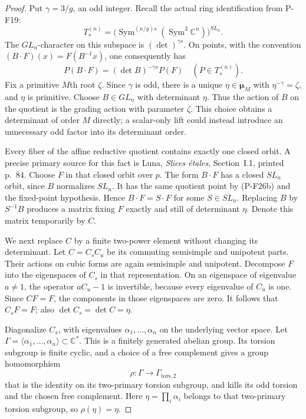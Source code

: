 \documentclass[11pt,a4paper]{article}
\begin{document}
\begin{proof}
Put $\gamma=3/g$, an odd integer. Recall the actual ring
identification from P-F19:
\[
 T^{(n)}_s=\bigl(\operatorname{Sym}^{(n/g)s}
                         (\operatorname{Sym}^3\mathbb C^n)\bigr)^{SL_n}.
\]
The $GL_n$-character on this subspace is $(\det)^{\gamma s}$.
On points, with the convention $(B\cdot F)(x)=F(B^{-1}x)$,
one consequently has
\[
 P(B\cdot F)=(\det B)^{-\gamma s}P(F)
       \quad(P\in T^{(n)}_s).
 \tag{P-F26b}
\]
Fix a primitive $M$th root $\zeta$. Since $\gamma$ is odd,
there is a unique $\eta\in\boldsymbol\mu_M$ with
$\eta^{-\gamma}=\zeta$, and $\eta$ is primitive. Choose
$B\in GL_n$ with determinant $\eta$. Thus the action of $B$
on the quotient is the grading action with parameter $\zeta$.
This choice obtains a determinant of order $M$ directly; a
scalar-only lift could instead introduce an unnecessary odd
factor into its determinant order.

Every fiber of the affine reductive quotient contains exactly
one closed orbit. A precise primary source for this fact is
Luna, \emph{Slices \'etales}, Section~I.1, printed p.~84.
Choose $F$ in that closed orbit over $p$. The form $B\cdot F$
has a closed $SL_n$ orbit, since $B$ normalizes $SL_n$.
It has the same quotient point by (P-F26b) and the fixed-point
hypothesis. Hence $B\cdot F=S\cdot F$ for some $S\in SL_n$.
Replacing $B$ by $S^{-1}B$ produces a matrix fixing $F$
exactly and still of determinant $\eta$. Denote this matrix
temporarily by $C$.

We next replace $C$ by a finite two-power element without
changing its determinant. Let $C=C_sC_u$ be its commuting
semisimple and unipotent parts. Their actions on cubic forms
are again semisimple and unipotent. Decompose $F$ into the
eigenspaces of $C_s$ in that representation. On an eigenspace
of eigenvalue $a\ne1$, the operator $aC_u-1$ is invertible,
because every eigenvalue of $C_u$ is one. Since $C F=F$,
the components in those eigenspaces are zero. It follows that
$C_sF=F$; also $\det C_s=\det C=\eta$.

Diagonalize $C_s$, with eigenvalues $\alpha_1,\ldots,\alpha_n$
on the underlying vector space. Let
$\Gamma=\langle\alpha_1,\ldots,\alpha_n\rangle\subset\mathbb C^*$.
This is a finitely generated abelian group. Its torsion
subgroup is finite cyclic, and a choice of a free complement
gives a group homomorphism
\[
 \rho:\Gamma\longrightarrow\Gamma_{\mathrm{tors},2}
\]
that is the identity on its two-primary torsion subgroup,
and kills its odd torsion and the chosen free complement.
Here $\eta=\prod_i\alpha_i$ belongs to that two-primary
torsion subgroup, so $\rho(\eta)=\eta$.


\end{proof}
\end{document}
